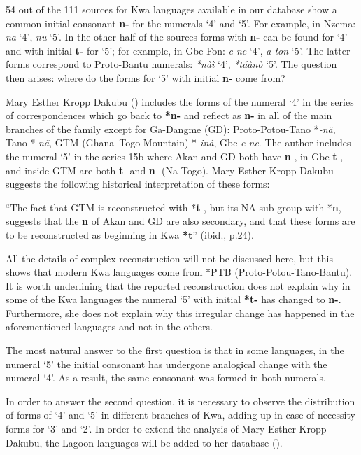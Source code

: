 54 out of the 111 sources for Kwa languages available in our database show a common initial consonant \textbf{n-} for the numerals ‘4’ and ‘5’. For example, in Nzema: \textit{na} ‘4’, \textit{nu} ‘5’. In the other half of the sources forms with \textbf{n-} can be found for ‘4’ and with initial \textbf{t-} for ‘5’; for example, in Gbe-Fon: \textit{e-ne} ‘4’, \textit{a-ton} ‘5’. The latter forms correspond to Proto-Bantu numerals:  \textit{*nàì} ‘4’, \textit{*táànò} ‘5’. The question then arises: where do the forms for ‘5’ with initial \textbf{n-} come from? 

Mary Esther Kropp Dakubu (\citealt{KroppDakubu2012}) includes the forms of the numeral ‘4’ in the series of correspondences which go back to \textbf{*n-}   and reflect as \textbf{n-} in all of the main branches of the family except for Ga-Dangme (GD): Proto-Potou-Tano *\textit{-n{\~{a}}}, Tano *-\textit{n{\~{a}}}, GTM (Ghana–Togo Mountain) *\textit{-in{\^{a}}}, Gbe \textit{e-ne}. The author includes the numeral ‘5’ in the series 15b where Akan and GD both have \textbf{n}-, in Gbe \textbf{t}-, and inside GTM are both \textbf{t}- and \textbf{n}- (Na-Togo). Mary Esther Kropp Dakubu suggests the following historical interpretation of these forms: 

“The fact that GTM is reconstructed with *\textbf{t}-, but its NA sub-group with *\textbf{n}, suggests that the \textbf{n} of Akan and GD are also secondary, and that these forms are to be reconstructed as beginning in Kwa \textbf{*t}” (ibid., p.24). 

All the details of complex reconstruction will not be discussed here, but this shows that modern Kwa languages come from *PTB (Proto-Potou-Tano-Bantu). It is worth underlining that the reported reconstruction does not explain why in some of the Kwa languages the numeral ‘5’ with initial \textbf{*t-} has changed to \textbf{n-}. Furthermore, she does not explain why this irregular change has happened in the aforementioned languages and not in the others. 

The most natural answer to the first question is that in some languages, in the numeral ‘5’ the initial consonant has undergone analogical change with the numeral ‘4’. As a result, the same consonant was formed in both numerals. 

In order to answer the second question, it is necessary to observe the distribution of forms of ‘4’ and ‘5’ in different branches of Kwa, adding up in case of necessity forms for ‘3’ and ‘2’. In order to extend the analysis of Mary Esther Kropp Dakubu, the Lagoon languages will be added to her database (). 


